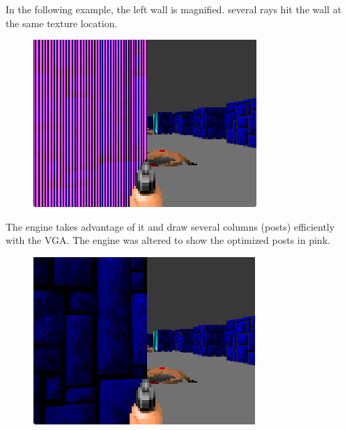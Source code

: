In the following example, the left wall is magnified. several rays hit the wall at the same texture location.
\begin{figure}[H]
 \centering
 \includegraphics[width=\textwidth]{imgs/post_optimization_1_pink_show.png}
\end{figure}
The engine takes advantage of it and draw several columns (posts) efficiently with the VGA. The engine was altered to show the optimized posts in pink.
\begin{figure}[H]
 \centering
 \includegraphics[width=\textwidth]{imgs/post_optimization_1_show.png}
\end{figure}


